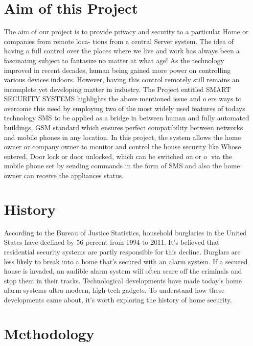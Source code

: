 \documentclass[twoside,a4paper,16pt]{book}
\begin{document}
{{\section{Aim of this Project}
The aim of our project is to provide privacy and security to a particular Home or companies from remote loca-
tions from a central Server system. The idea of having a full control over the places where we live and work has always
been a fascinating subject to fantasize no matter at what age! As the technology improved in recent decades, human
being gained more power on controlling various devices indoors. However, having this control remotely still remains
an incomplete yet developing matter in industry.
The Project entitled SMART SECURITY SYSTEMS highlights the above mentioned issue and oers ways to
overcome this need by employing two of the most widely used features of todays technology SMS to be applied as a
bridge in between human and fully automated buildings, GSM standard which ensures perfect compatibility between
networks and mobile phones in any location.
In this project, the system allows the home owner or company owner to monitor and control the house security like
Whose entered, Door lock or door unlocked, which can be switched on or o via the mobile phone set by sending
commands in the form of SMS and also the home owner can receive the appliances status.
\section{History}
According to the Bureau of Justice Statistics, household burglaries in the United States have declined by 56 percent from 1994 to 2011. It's believed that residential security systems are partly responsible for this decline. Burglars are less likely to break into a home that's secured with an alarm system. If a secured house is invaded, an audible alarm system will often scare off the criminals and stop them in their tracks. Technological developments have made today's home alarm systems ultra-modern, high-tech gadgets. To understand how these developments came about, it's worth exploring the history of home security.\\

\section{ Methodology}

}}
\end{document}
